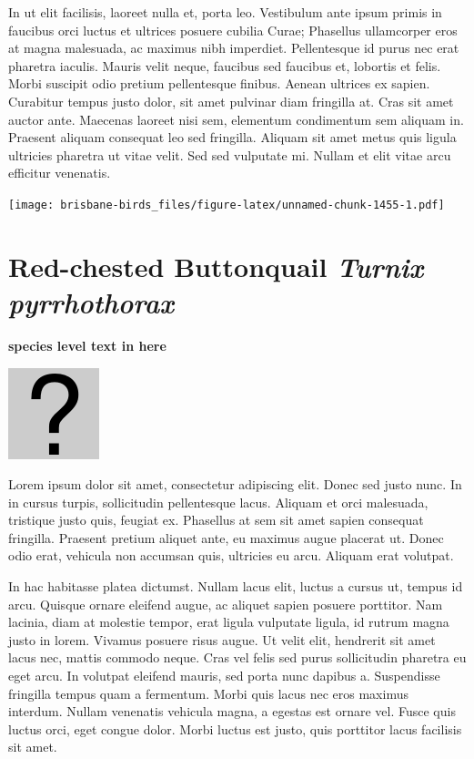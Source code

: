 \documentclass[]{book}
\let\origfigure\figure
\let\endorigfigure\endfigure
\renewenvironment{figure}[1][2] {
  \expandafter\origfigure\expandafter[H]
} {
  \endorigfigure
}
\begin{document}
In ut elit facilisis, laoreet nulla et, porta leo. Vestibulum ante ipsum
primis in faucibus orci luctus et ultrices posuere cubilia Curae;
Phasellus ullamcorper eros at magna malesuada, ac maximus nibh
imperdiet. Pellentesque id purus nec erat pharetra iaculis. Mauris velit
neque, faucibus sed faucibus et, lobortis et felis. Morbi suscipit odio
pretium pellentesque finibus. Aenean ultrices ex sapien. Curabitur
tempus justo dolor, sit amet pulvinar diam fringilla at. Cras sit amet
auctor ante. Maecenas laoreet nisi sem, elementum condimentum sem
aliquam in. Praesent aliquam consequat leo sed fringilla. Aliquam sit
amet metus quis ligula ultricies pharetra ut vitae velit. Sed sed
vulputate mi. Nullam et elit vitae arcu efficitur venenatis.

\begin{figure}
\centering
\texttt{[image: brisbane-birds\_files/figure-latex/unnamed-chunk-1455-1.pdf]}
\caption{\label{fig:unnamed-chunk-1455}insert figure caption}
\end{figure}

\section{\texorpdfstring{Red-chested Buttonquail \emph{Turnix
pyrrhothorax}}{Red-chested Buttonquail Turnix pyrrhothorax}}\label{red-chested-buttonquail-turnix-pyrrhothorax}

\textbf{species level text in here}

\begin{figure}
\centering
\includegraphics{assets/missing.png}
\caption{No image for species}
\end{figure}

Lorem ipsum dolor sit amet, consectetur adipiscing elit. Donec sed justo
nunc. In in cursus turpis, sollicitudin pellentesque lacus. Aliquam et
orci malesuada, tristique justo quis, feugiat ex. Phasellus at sem sit
amet sapien consequat fringilla. Praesent pretium aliquet ante, eu
maximus augue placerat ut. Donec odio erat, vehicula non accumsan quis,
ultricies eu arcu. Aliquam erat volutpat.

In hac habitasse platea dictumst. Nullam lacus elit, luctus a cursus ut,
tempus id arcu. Quisque ornare eleifend augue, ac aliquet sapien posuere
porttitor. Nam lacinia, diam at molestie tempor, erat ligula vulputate
ligula, id rutrum magna justo in lorem. Vivamus posuere risus augue. Ut
velit elit, hendrerit sit amet lacus nec, mattis commodo neque. Cras vel
felis sed purus sollicitudin pharetra eu eget arcu. In volutpat eleifend
mauris, sed porta nunc dapibus a. Suspendisse fringilla tempus quam a
fermentum. Morbi quis lacus nec eros maximus interdum. Nullam venenatis
vehicula magna, a egestas est ornare vel. Fusce quis luctus orci, eget
congue dolor. Morbi luctus est justo, quis porttitor lacus facilisis sit
amet.
\end{document}
